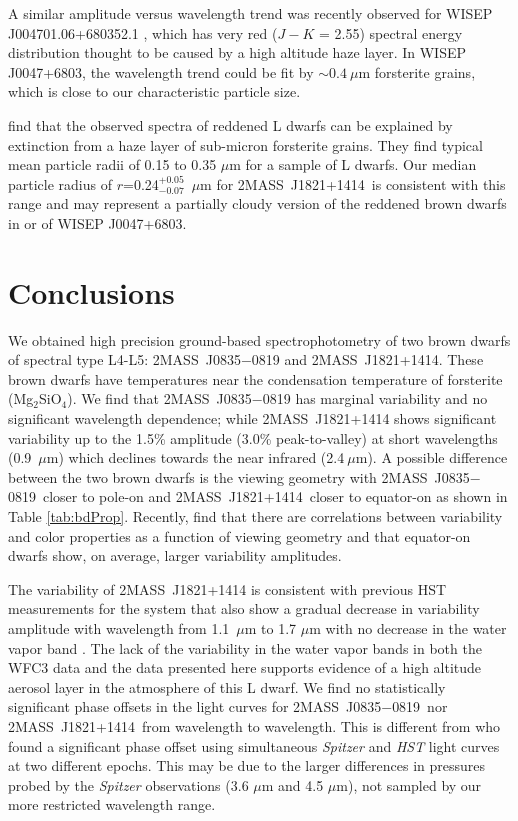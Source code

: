 \documentclass[twocolumn]{aastex6}
\newcommand{\sha}{2MASS~J0835$-$0819}
\newcommand{\shb}{2MASS~J1821+1414}
\begin{document}
A similar amplitude versus wavelength trend was recently observed for WISEP J004701.06+680352.1 \citep{2016ApJ...829L..32L}, which has very red ($J-K$ = 2.55) spectral energy distribution thought to be caused by a high altitude haze layer.
In WISEP J0047+6803, the wavelength trend could be fit by $\sim0.4~\mu$m forsterite grains, which is close to our characteristic particle size.

\citet{hiranaka2016subMicronDust} find that the observed spectra of reddened L dwarfs can be explained by extinction from a haze layer of sub-micron forsterite grains.
They find typical mean particle radii of 0.15 to 0.35 $\mu$m for a sample of L dwarfs.
Our median particle radius of $r$=0.24$^{+0.05}_{-0.07}$~$\mu$m for \shb\ is consistent with this range and may represent a partially cloudy version of the reddened brown dwarfs in \citet{hiranaka2016subMicronDust} or of WISEP J0047+6803.

\section{Conclusions}\label{sec:conclusions}

We obtained high precision ground-based spectrophotometry of two brown dwarfs of spectral type L4-L5: {\sha} and {\shb}.
These brown dwarfs have temperatures near the condensation temperature of forsterite (Mg$_2$SiO$_4$).
We find that {\sha} has marginal variability and no significant wavelength dependence; while
{\shb} shows significant variability up to the 1.5\% amplitude (3.0\% peak-to-valley) at short wavelengths (0.9~$\mu$m) which declines towards the near infrared (2.4$~\mu$m).
A possible difference between the two brown dwarfs is the viewing geometry with \sha\ closer to pole-on and \shb\ closer to equator-on as shown in Table \ref{tab:bdProp}.
Recently, \citet{vos2017viewingGeom} find that there are correlations between variability and color properties as a function of viewing geometry and that equator-on dwarfs show, on average, larger variability amplitudes.

The variability of {\shb} is consistent with previous HST measurements for the system that also show a gradual decrease in variability amplitude with wavelength from 1.1~$\mu$m to 1.7 $\mu$m with no decrease in the water vapor band \citep{2016ApJ...826....8Y}.
The lack of the variability in the water vapor bands in both the WFC3 data and the data presented here supports evidence of a high altitude aerosol layer in the atmosphere of this L dwarf.
We find no statistically significant phase offsets in the light curves for \sha\ nor \shb\ from wavelength to wavelength.
This is different from  \citep{2016ApJ...826....8Y} who found a significant phase offset using simultaneous {\em Spitzer} and {\em HST} light curves at two different epochs.
This may be due to the larger differences in pressures probed by the {\em Spitzer} observations (3.6 $\mu$m and 4.5 $\mu$m), not sampled by our more restricted wavelength range.
\end{document}
